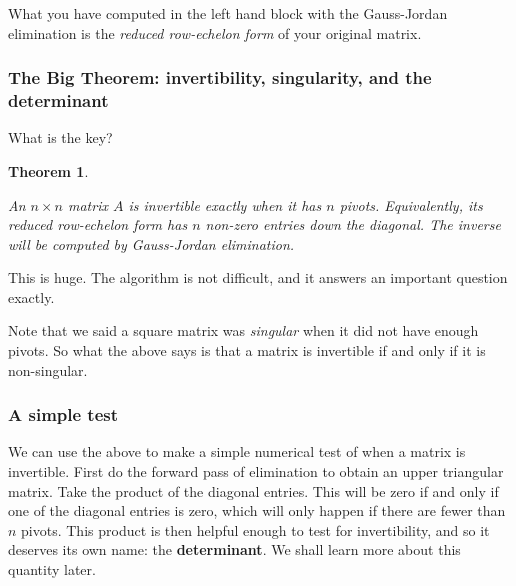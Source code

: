 \documentclass[10pt,]{book}
\newcommand{\terminology}[1]{\textbf{#1}}
\theoremstyle{plain}
\newtheorem{theorem}{Theorem}[chapter]
\theoremstyle{definition}
\numberwithin{equation}{section}
\begin{document}
        What you have computed in the left hand block with the Gauss-Jordan
        elimination is the \emph{reduced row-echelon form} of your original matrix.
\typeout{************************************************}
\typeout{************************************************}
\subsubsection[The Big Theorem: invertibility, singularity, and the determinant]{The Big Theorem: invertibility, singularity, and the determinant}\label{subsubsection-22}

        What is the key?
\begin{theorem}\label{theorem-1}

          An \(n\times n\) matrix \(A\) is invertible exactly when it has
          \(n\) pivots. Equivalently, its reduced row-echelon form has \(n\)
          non-zero entries down the diagonal. The inverse will be computed by
          Gauss-Jordan elimination.
        \end{theorem}
\par

        This is huge. The algorithm is not difficult, and it answers an
        important question exactly.
\par

        Note that we said a square matrix was \emph{singular} when it did not
        have enough pivots. So what the above says is that a matrix is invertible
        if and only if it is non-singular.
\typeout{************************************************}
\typeout{************************************************}
\subsubsection[A simple test]{A simple test}\label{subsubsection-23}

        We can use the above to make a simple numerical test of when a matrix is
        invertible. First do the forward pass of elimination to obtain an upper
        triangular matrix. Take the product of the diagonal entries. This will
        be zero if and only if one of the diagonal entries is zero, which will
        only happen if there are fewer than \(n\) pivots. This product is then
        helpful enough to test for invertibility, and so it deserves its own
        name: the \terminology{determinant}. We shall learn more about this quantity later.
\typeout{************************************************}
\typeout{************************************************}
\end{document}
